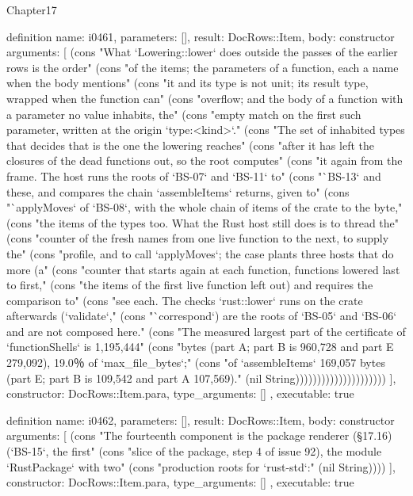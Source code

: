 \begin{lexlean}{Chapter17}
\begin{semanticmodule}
definition{
  name: i0461,
  parameters: [],
  result: DocRows::Item,
  body: constructor{
    arguments: [
      (cons "What `Lowering::lower` does outside the passes of the earlier rows is the order" (cons "of the items; the parameters of a function, each a name when the body mentions" (cons "it and its type is not unit; its result type, wrapped when the function can" (cons "overflow; and the body of a function with a parameter no value inhabits, the" (cons "empty match on the first such parameter, written at the origin `type:<kind>`." (cons "The set of inhabited types that decides that is the one the lowering reaches" (cons "after it has left the closures of the dead functions out, so the root computes" (cons "it again from the frame. The host runs the roots of `BS-07` and `BS-11` to" (cons "`BS-13` and these, and compares the chain `assembleItems` returns, given to" (cons "`applyMoves` of `BS-08`, with the whole chain of items of the crate to the byte," (cons "the items of the types too. What the Rust host still does is to thread the" (cons "counter of the fresh names from one live function to the next, to supply the" (cons "profile, and to call `applyMoves`; the case plants three hosts that do more (a" (cons "counter that starts again at each function, functions lowered last to first," (cons "the items of the first live function left out) and requires the comparison to" (cons "see each. The checks `rust::lower` runs on the crate afterwards (`validate`," (cons "`correspond`) are the roots of `BS-05` and `BS-06` and are not composed here." (cons "The measured largest part of the certificate of `functionShells` is 1,195,444" (cons "bytes (part A; part B is 960,728 and part E 279,092), 19.0％ of `max_file_bytes`;" (cons "of `assembleItems` 169,057 bytes (part E; part B is 109,542 and part A 107,569)." (nil String)))))))))))))))))))))
    ],
    constructor: DocRows::Item.para,
    type_arguments: []
  },
  executable: true
}

definition{
  name: i0462,
  parameters: [],
  result: DocRows::Item,
  body: constructor{
    arguments: [
      (cons "The fourteenth component is the package renderer (§17.16) (`BS-15`, the first" (cons "slice of the package, step 4 of issue 92), the module `RustPackage` with two" (cons "production roots for `rust-std`:" (nil String))))
    ],
    constructor: DocRows::Item.para,
    type_arguments: []
  },
  executable: true
}


\end{semanticmodule}
\end{lexlean}
